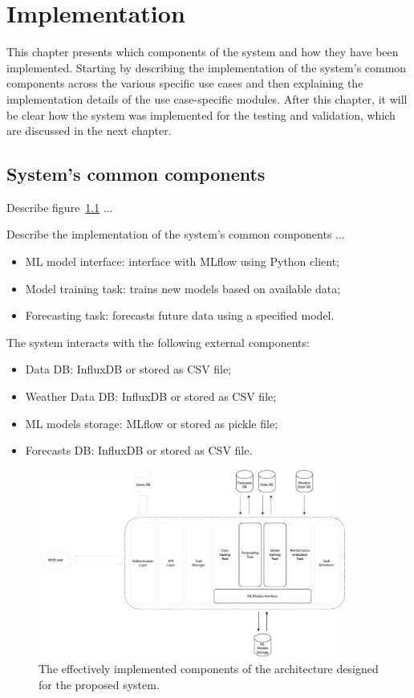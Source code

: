 \chapter{Implementation}
\label{cha:implementation}
\vspace{0.4 cm}

This chapter presents which components of the system and how they have been implemented.
Starting by describing the implementation of the system's common components across the various specific use cases and then explaining the implementation details of the use case-specific modules.
After this chapter, it will be clear how the system was implemented for the testing and validation, which are discussed in the next chapter.


\section{System's common components}
\label{sec:componentsimpl}
\vspace{0.2 cm}

Describe figure~\ref{fig:implementation} ...

Describe the implementation of the system's common components ...
\begin{itemize}
  \item ML model interface: interface with MLflow using Python client;
  \item Model training task: trains new models based on available data;
  \item Forecasting task: forecasts future data using a specified model.
\end{itemize}

The system interacts with the following external components:
\begin{itemize}
  \item Data DB: InfluxDB or stored as CSV file;
  \item Weather Data DB: InfluxDB or stored as CSV file;
  \item ML models storage: MLflow or stored as pickle file;
  \item Forecasts DB: InfluxDB or stored as CSV file.
\end{itemize}


\begin{figure}[H]
\centering
\includegraphics[width=0.9\textwidth]{images/implementation_components}
\caption{The effectively implemented components of the architecture designed for the proposed system.}
\label{fig:implementation}
\end{figure}


